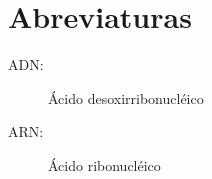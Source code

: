 \section*{Abreviaturas}

\begin{description}
\item[ADN:] Ácido desoxirribonucléico
\item[ARN:] Ácido ribonucléico

\end{description}
